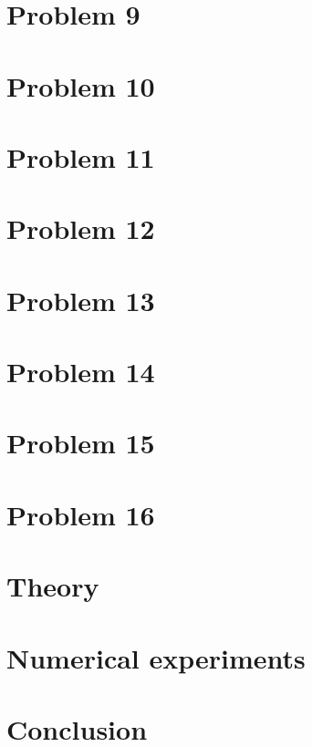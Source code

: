 \documentclass[11pt,a4paper,twoside,norsk]{article}
\begin{document}
\section{Problem 9}
 

\section{Problem 10}


\section{Problem 11}


\section{Problem 12}


\section{Problem 13}


\section{Problem 14}


\section{Problem 15}


\section{Problem 16}


\section{Theory}
\label{sec:theory}


\section{Numerical experiments}
\label{sec:numexp}


\section{Conclusion}
\label{sec:conclusion}



 
\end{document}
